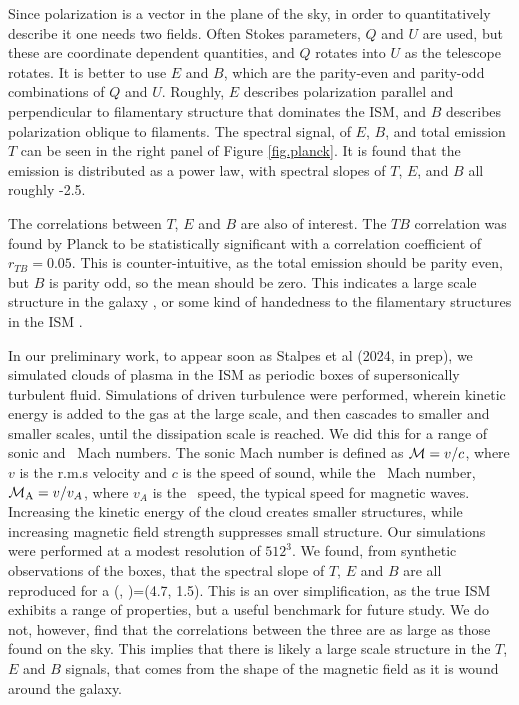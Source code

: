 Since polarization is a vector in the plane of the sky, in order to
quantitatively describe it one needs two fields.
Often Stokes parameters, $Q$ and $U$ are used, but these are coordinate
dependent quantities, and $Q$ rotates into $U$ as the telescope rotates.  It is
better to use $E$ and $B$, which are the parity-even and parity-odd combinations
of  $Q$ and $U$.  Roughly, $E$ describes polarization parallel and perpendicular
to filamentary structure that dominates the ISM, and $B$ describes polarization
oblique to filaments.  The spectral signal, of $E$, $B$, and total emission $T$
can be seen in the right panel of Figure \ref{fig.planck}.  It is found that the
emission is distributed as a power law, with spectral slopes of $T$, $E$, and
$B$ all roughly -2.5.  

The correlations between $T$, $E$ and $B$ are also of interest.  The $TB$
correlation was found by Planck \citep{Planck18xi} to be statistically
significant with a correlation coefficient of $r_{TB}=0.05$.  This is
counter-intuitive, as the total emission should be parity even, but $B$ is
parity odd, so the mean should be zero.  This indicates a large scale structure
in the galaxy \citep{Brandenburg20}, 
or some kind of handedness to the filamentary structures in the ISM
\citep{Huffenberger20}.  

In our preliminary work, to appear soon as Stalpes et al (2024, in prep),
we simulated clouds of plasma in the ISM as periodic boxes of supersonically turbulent fluid.
 Simulations of
driven turbulence were performed, wherein kinetic energy is added to the gas at the large
scale, and then cascades to smaller and smaller scales, until the dissipation
scale is reached.  We did this for a range of sonic and \alf\ Mach numbers.  The
sonic Mach number is defined as $\mathcal{M}=v/c$, where $v$ is the r.m.s velocity and $c$ is the
speed of sound, while the \alf\ Mach number, $\mathcal{M_{\rm{A}}}=v/v_A$, where $v_A$ is
the \alf\ speed, the typical speed for magnetic waves.  Increasing the kinetic
energy of the cloud creates smaller structures, while increasing magnetic field
strength suppresses small structure.  
Our simulations were performed at a modest resolution of
$512^3$.  We found, from synthetic observations of the boxes, that the spectral
slope of $T$, $E$ and $B$ are all reproduced for a (\mach, \alfmach)=(4.7, 1.5).
This is an over simplification, as the true ISM exhibits a range of properties,
but a useful benchmark for future study.
We do not, however, find that the correlations between the three are as large as
those found on the sky.  This implies that there is likely a large scale
structure in the $T$, $E$ and $B$ signals, that comes from the shape of the magnetic field as it is wound around
the galaxy.  

